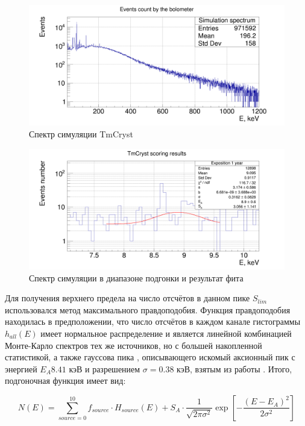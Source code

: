 \documentclass[a4paper,article,14pt]{extarticle}
\begin{document}
\begin{figure}[h!]
    \centering
    \includegraphics[width = \textwidth]{images/SpectrumTmCryst.png}
    \caption{Спектр симуляции TmCryst}
    \label{hist_all}
\end{figure}

\begin{figure}[h!]
    \centering
    \includegraphics[width = \textwidth]{images/AxionFit.png}
    \caption{Спектр симуляции в диапазоне подгонки и результат фита}
    \label{AxionFit}
\end{figure}
Для получения верхнего предела на число отсчётов в данном пике $S_{lim}$ использовался метод максимального правдоподобия. Функция правдоподобия находилась в предположении, что число отсчётов в каждом канале гистограммы $h_{all} \left( E \right)$ имеет нормальное распределение и является линейной комбинацией Монте-Карло спектров тех же источников, но с большей накопленной статистикой, а также гауссова пика , описывающего искомый аксионный пик с энергией $E_A 8.41 \text{ кэВ}$ и разрешением $\sigma = 0.38 \text{ кэВ}$, взятым из работы \cite{test_bolometric_tm}. Итого, подгоночная функция имеет вид:

\begin{equation}
    N\left( E \right) = \sum\limits_{source = 0}^{10} {{f_{source}} \cdot {H_{source}}\left( E \right)}  + {S_A} \cdot \frac{1}{{\sqrt {2\pi {\sigma ^2}} }}\exp \left[ { - \frac{{{{\left( {E - {E_A}} \right)}^2}}}{{2{\sigma ^2}}}} \right]
\end{equation}
\end{document}
